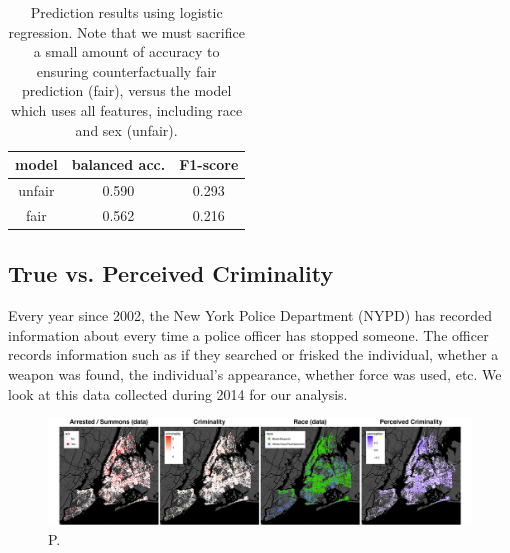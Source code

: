 \begin{table}[t]
\vspace{-2ex}
\caption{Prediction results using logistic regression. Note that we must sacrifice a small amount of accuracy to ensuring counterfactually fair prediction (fair), versus the model which uses all features, including race and sex (unfair).}
\vspace{-3ex}
\label{table.pred_law}
\begin{center}
\resizebox{\columnwidth}{!}
{
\begin{sc}
\footnotesize
\begin{tabular}{c|c|c}
\hline
\hline
model & balanced acc. & F1-score  \\
\hline
unfair & 0.590 & 0.293 \\ \hline
fair  &  0.562 & 0.216 \\
\hline
\end{tabular}
\end{sc}
}
\end{center}
\vspace{-4ex}
\end{table}


\subsection{True vs. Perceived Criminality}
Every year since 2002, the New York Police Department (NYPD) has recorded information about every time a police officer has stopped someone. The officer records information such as if they searched or frisked the individual, whether a weapon was found, the individual's appearance, whether force was used, etc. We look at this data collected during 2014 for our analysis.

\begin{figure}[th!]
\begin{center}
\vspace{-2ex}
\centerline{\includegraphics[width=\textwidth]{stop_and_frisk_graphs.png}}
\vspace{-2ex}
\caption{P.}
\label{figure.criminality}
\vspace{-2ex}
\end{center}
\end{figure}

